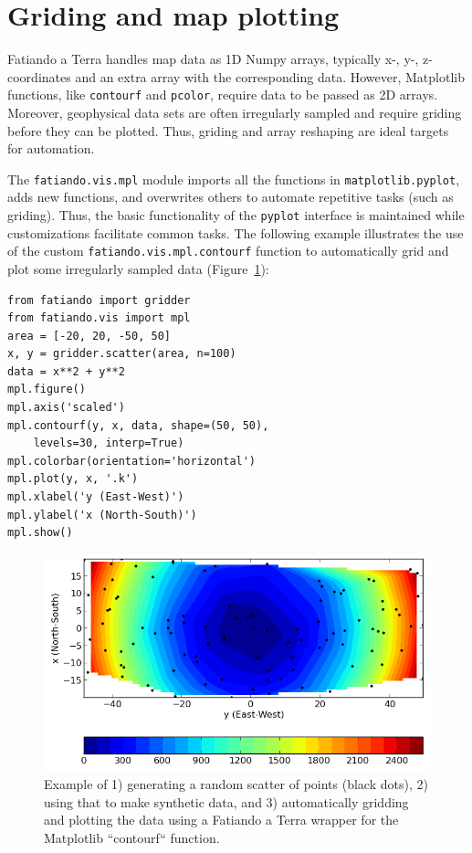 \section{Griding and map plotting}

Fatiando a Terra handles map data as 1D Numpy arrays, typically x-, y-,
z-coordinates and an extra array with the corresponding data. However,
Matplotlib functions, like \texttt{contourf} and \texttt{pcolor},
require data to be passed as 2D arrays. Moreover, geophysical data sets
are often irregularly sampled and require griding before they can be
plotted. Thus, griding and array reshaping are ideal targets for
automation.

The \texttt{fatiando.vis.mpl} module imports all the functions in
\texttt{matplotlib.pyplot}, adds new functions, and overwrites others to
automate repetitive tasks (such as griding). Thus, the basic
functionality of the \texttt{pyplot} interface is maintained while
customizations facilitate common tasks. The following example
illustrates the use of the custom \texttt{fatiando.vis.mpl.contourf}
function to automatically grid and plot some irregularly sampled data
(Figure~\ref{fig:p1-contourf}):

\begin{verbatim}
from fatiando import gridder
from fatiando.vis import mpl
area = [-20, 20, -50, 50]
x, y = gridder.scatter(area, n=100)
data = x**2 + y**2
mpl.figure()
mpl.axis('scaled')
mpl.contourf(y, x, data, shape=(50, 50),
    levels=30, interp=True)
mpl.colorbar(orientation='horizontal')
mpl.plot(y, x, '.k')
mpl.xlabel('y (East-West)')
mpl.ylabel('x (North-South)')
mpl.show()
\end{verbatim}


\begin{figure}
    \centering
    \includegraphics[width=\textwidth]{figures/paper-fatiando/gridding_plotting_contourf}
    \caption{
    Example of 1) generating a random scatter of points (black dots),
    2) using that to make synthetic data, and
    3) automatically gridding and plotting the data using a
    Fatiando a Terra wrapper for the Matplotlib ``contourf``
    function.
    }
    \label{fig:p1-contourf}
\end{figure}


